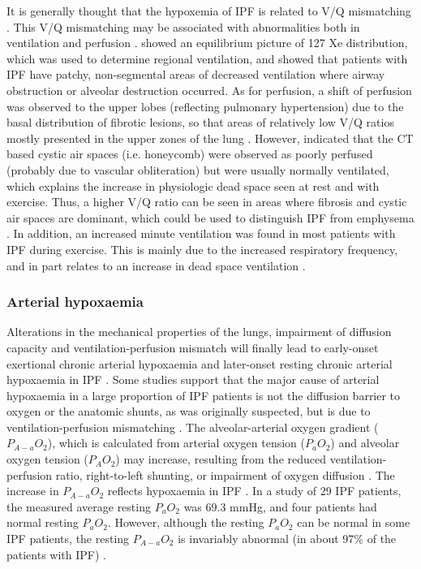 It is generally thought that the hypoxemia of IPF is related to V/Q mismatching \citep{wagner1976distribution,crystal1976idiopathic,american2000idiopathic}. This V/Q mismatching may be associated with abnormalities both in ventilation and perfusion \citep{crystal1976idiopathic,strickland1993cause}. \cite{crystal1976idiopathic} showed an equilibrium picture of 127 Xe distribution, which was used to determine regional ventilation, and showed that patients with IPF have patchy, non-segmental areas of decreased ventilation where airway obstruction or alveolar destruction occurred. As for perfusion, a shift of perfusion was observed to the upper lobes (reflecting pulmonary hypertension) due to the basal distribution of fibrotic lesions, so that areas of relatively low V/Q ratios mostly presented in the upper zones of the lung \citep{crystal1976idiopathic}. However, \cite{strickland1993cause} indicated that the CT based cystic air spaces (i.e. honeycomb) were observed as poorly perfused (probably due to vascular obliteration) but were usually  normally ventilated, which explains the increase in physiologic dead space seen at rest and with exercise. Thus, a higher V/Q ratio can be seen in areas where fibrosis and cystic air spaces are dominant, which could be used to distinguish IPF from emphysema \citep{strickland1993cause}. In addition, an increased minute ventilation was found in most patients with IPF during exercise. This is mainly due to the increased respiratory frequency, and in part relates to an increase in dead space ventilation \citep{american2000idiopathic}.

\subsubsection{Arterial hypoxaemia}
Alterations in the mechanical properties of the lungs, impairment of diffusion capacity and ventilation-perfusion mismatch will finally lead to early-onset exertional chronic arterial hypoxaemia and later-onset resting chronic arterial hypoxaemia in IPF \citep{hempleman1991estimating, hughes1991dlco, plantier2018physiology}. Some studies support that the major cause of arterial hypoxaemia in a large proportion of IPF patients is not the diffusion barrier to oxygen or the anatomic shunts, as was originally suspected, but is due to ventilation-perfusion mismatching \citep{ finley1962cause, wagner1976distribution, american2000idiopathic}. The alveolar-arterial oxygen gradient ($P_{A-a}O_2$), which is calculated from arterial oxygen tension ($P_{a}O_2$) and alveolar oxygen tension ($P_{A}O_2$) may increase, resulting from the reduced ventilation-perfusion ratio, right-to-left shunting, or impairment of oxygen diffusion \citep{plantier2018physiology}. The increase in $P_{A-a}O_2$ reflects hypoxaemia in IPF \citep{agusti1991mechanisms}. In a study of 29 IPF patients, the measured average resting $P_a O_2$ was 69.3 mmHg, and four patients had normal resting $P_{a}O_2$. However, although the resting $P_{a}O_2$ can be normal in some IPF patients, the resting $P_{A-a}O_2$ is invariably abnormal (in about 97\% of the patients with IPF) \citep{crystal1976idiopathic}.

